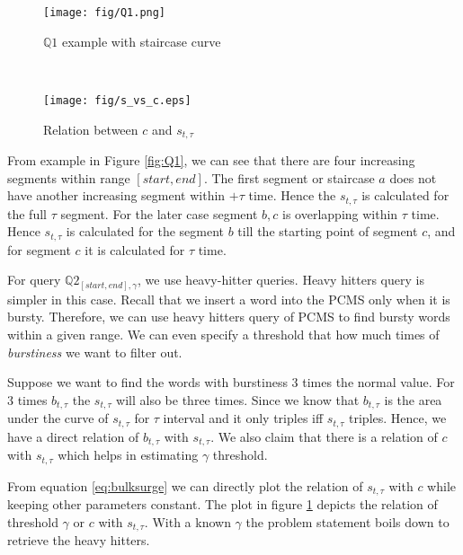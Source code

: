 \begin{figure}[!t]
    \begin{minipage}{0.48\linewidth}
        \centering
        \texttt{[image: fig/Q1.png]} 
        \vspace{-8mm}
        \caption{$\mathbb{Q}1$ example with staircase curve}\vspace{10mm}
        \label{fig:Q1}
    \end{minipage}
    \hfill\
    \begin{minipage}{0.48\linewidth}
        \centering
        \vspace{-12mm}
        \texttt{[image: fig/s\_vs\_c.eps]}
        \vspace{-8mm}
        \caption{Relation between $c$ and $s_{t, \tau}$}
        \label{fig:s_vs_c}
    \end{minipage}
\end{figure}

From example in Figure \ref{fig:Q1}, we can see that there are four increasing
segments within range $[start,end]$. The first segment or staircase $a$ does
not have another increasing segment within $+\tau$ time. Hence the $s_{t,\tau}$
is calculated for the full $\tau$ segment. For the later case segment  $b,c$
is overlapping within $\tau$ time. Hence $s_{t,\tau}$ is calculated for the
segment $b$ till the starting point of segment $c$, and for segment $c$ it is
calculated for $\tau$ time. 


For query $\mathbb{Q}2_{[start,end],\gamma}$, we use heavy-hitter queries. Heavy
hitters query is simpler in this case. Recall that we insert a word into
the PCMS only when it is bursty. Therefore, we can use heavy hitters query of
PCMS to find bursty words within a given range. We can even specify a threshold
that how much times of \emph{burstiness} we want to filter out.

Suppose we want to find the words with burstiness 3 times the normal value. For
3 times $b_{t,\tau}$ the $s_{t,\tau}$ will also be three times. Since we know
that $b_{t,\tau}$ is the area under the curve of $s_{t,\tau}$ for $\tau$ interval
and it only triples iff $s_{t,\tau}$ triples. Hence, we have a direct relation
of $b_{t,\tau}$ with $s_{t,\tau}$. We also claim that there is a relation of $c$
with $s_{t,\tau}$ which helps in estimating $\gamma$ threshold. 

From equation \ref{eq:bulksurge} we can directly plot the relation of
$s_{t,\tau}$ with $c$ while keeping other parameters constant. The plot in
figure \ref{fig:s_vs_c} depicts the relation of threshold $\gamma$ or $c$ with $s_{t,\tau}$. With
a known $\gamma$ the problem statement boils down to retrieve the heavy
hitters.

